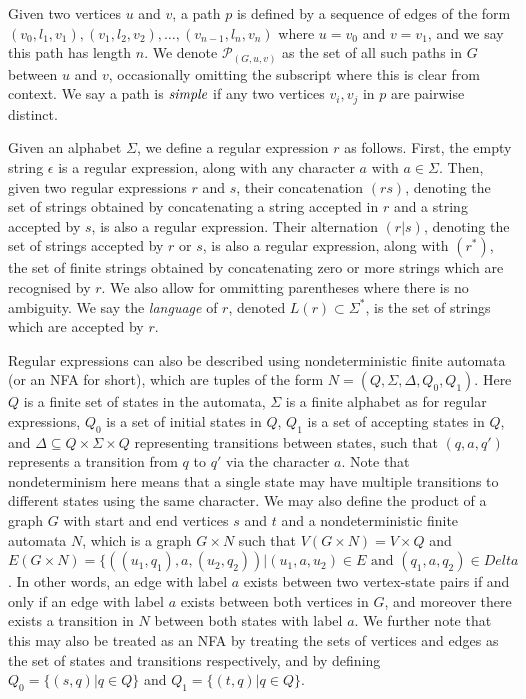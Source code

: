 \documentclass{article}
\begin{document}
Given two vertices $u$ and $v$, a path $p$ is defined by a sequence of edges of the form $(v_0, l_1, v_1), (v_1, l_2, v_2), \dots, (v_{n-1}, l_n, v_n)$ where $u = v_0$ and $v = v_1$, and we say this path has length $n$. We denote $\mathcal{P}_(G, u ,v)$ as the set of all such paths in $G$ between $u$ and $v$, occasionally omitting the subscript where this is clear from context.  We say a path is $\emph{simple}$ if any two vertices $v_i, v_j$ in $p$ are pairwise distinct.

Given an alphabet $\Sigma$, we define a regular expression $r$ as follows. First, the empty string $\epsilon$ is a regular expression, along with any character $a$ with $a \in \Sigma$. Then, given two regular expressions $r$ and $s$, their concatenation $(rs)$, denoting the set of strings obtained by concatenating a string accepted in $r$ and a string accepted by $s$, is also a regular expression. Their alternation $(r | s)$, denoting the set of strings accepted by $r$ or $s$, is also a regular expression, along with $(r^*)$, the set of finite strings obtained by concatenating zero or more strings which are recognised by $r$. We also allow for ommitting parentheses where there is no ambiguity. We say the \emph{language} of $r$, denoted $L(r) \subset \Sigma^*$, is the set of strings which are accepted by $r$.

Regular expressions can also be described using nondeterministic finite automata (or an NFA for short), which are tuples of the form $N = (Q, \Sigma, \Delta, Q_0, Q_1)$. Here $Q$ is a finite set of states in the automata, $\Sigma$ is a finite alphabet as for regular expressions, $Q_0$ is a set of initial states in $Q$, $Q_1$ is a set of accepting states in $Q$, and $\Delta \subseteq Q \times \Sigma \times Q$ representing transitions between states, such that $(q, a, q')$ represents a transition from $q$ to $q'$ via the character $a$. Note that nondeterminism here means that a single state may have multiple transitions to different states using the same character. We may also define the product of a graph $G$ with start and end vertices $s$ and $t$ and a nondeterministic finite automata $N$, which is a graph $G \times N$ such that $V(G \times N) = V \times Q$ and $E(G \times N) = \{((u_1, q_1), a, (u_2,q_2)) | (u_1, a, u_2) \in E \text{ and } (q_1, a, q_2) \in Delta$. In other words, an edge with label $a$ exists between two vertex-state pairs if and only if an edge with label $a$ exists between both vertices in $G$, and moreover there exists a transition in $N$ between both states with label $a$. We further note that this may also be treated as an NFA by treating the sets of vertices and edges as the set of states and transitions respectively, and by defining $Q_0 = \{(s, q) | q \in Q\}$ and $Q_1 = \{(t, q) | q \in Q\}$.
\end{document}
